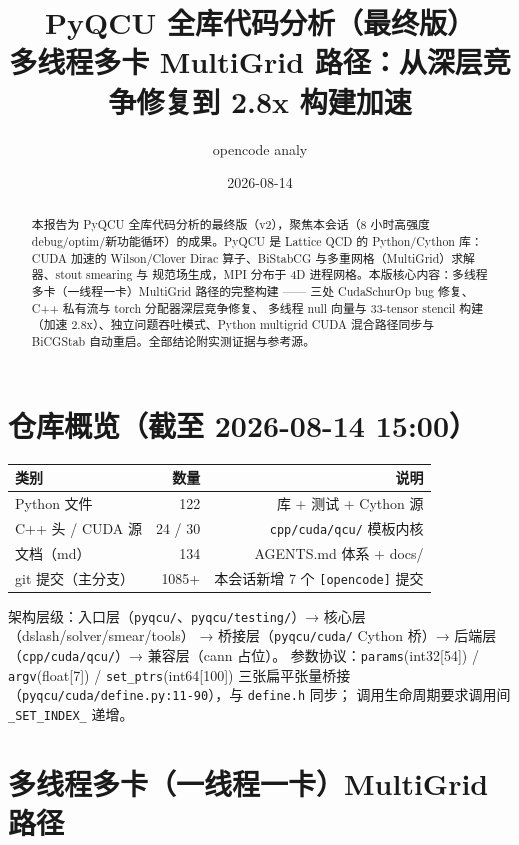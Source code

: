 \documentclass[UTF8]{ctexart}
\title{PyQCU 全库代码分析（最终版）\\[6pt]\large 多线程多卡 MultiGrid 路径：从深层竞争修复到 2.8x 构建加速}
\author{opencode analy}
\date{2026-08-14}
\begin{document}
\maketitle
\begin{abstract}
本报告为 PyQCU 全库代码分析的最终版（v2），聚焦本会话（8 小时高强度
debug/optim/新功能循环）的成果。PyQCU 是 Lattice QCD 的 Python/Cython 库：CUDA 加速的
Wilson/Clover Dirac 算子、BiStabCG 与多重网格（MultiGrid）求解器、stout smearing 与
规范场生成，MPI 分布于 4D 进程网格。本版核心内容：多线程多卡（一线程一卡）MultiGrid
路径的完整构建 —— 三处 CudaSchurOp bug 修复、C++ 私有流与 torch 分配器深层竞争修复、
多线程 null 向量与 33-tensor stencil 构建（加速 2.8x）、独立问题吞吐模式、Python
multigrid CUDA 混合路径同步与 BiCGStab 自动重启。全部结论附实测证据与参考源。
\end{abstract}

\tableofcontents

\section{仓库概览（截至 2026-08-14 15:00）}

\begin{center}
\begin{tabular}{lrr}
\toprule
类别 & 数量 & 说明 \\
\midrule
Python 文件 & 122 & 库 + 测试 + Cython 源 \\
C++ 头 / CUDA 源 & 24 / 30 & \texttt{cpp/cuda/qcu/} 模板内核 \\
文档（md） & 134 & AGENTS.md 体系 + docs/ \\
git 提交（主分支） & 1085+ & 本会话新增 7 个 \texttt{[opencode]} 提交 \\
\bottomrule
\end{tabular}
\end{center}

架构层级：入口层（\texttt{pyqcu/}、\texttt{pyqcu/testing/}）→ 核心层（dslash/solver/smear/tools）
→ 桥接层（\texttt{pyqcu/cuda/} Cython 桥）→ 后端层（\texttt{cpp/cuda/qcu/}）→ 兼容层（cann 占位）。
参数协议：\texttt{params}(int32[54]) / \texttt{argv}(float[7]) / \texttt{set\_ptrs}(int64[100])
三张扁平张量桥接（\texttt{pyqcu/cuda/define.py:11-90}），与 \texttt{define.h} 同步；
调用生命周期要求调用间 \texttt{\_SET\_INDEX\_} 递增。

\section{多线程多卡（一线程一卡）MultiGrid 路径}
\end{document}
